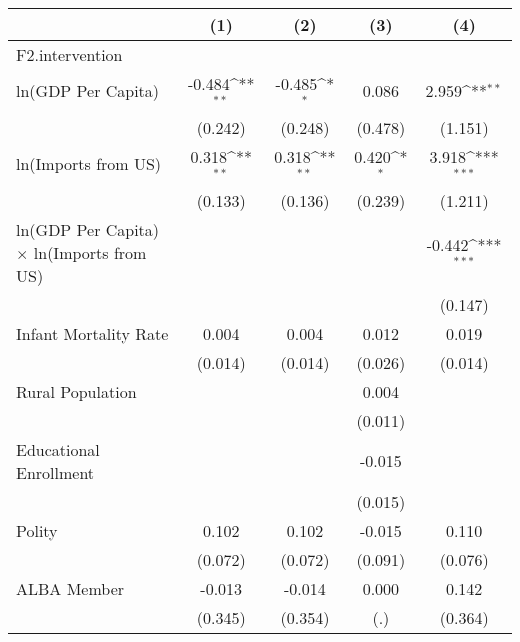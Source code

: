 {
\def\sym#1{\ifmmode^{#1}\else\(^{#1}\)\fi}
\begin{tabular}{l*{4}{c}}
\hline\hline
                &\multicolumn{1}{c}{(1)}         &\multicolumn{1}{c}{(2)}         &\multicolumn{1}{c}{(3)}         &\multicolumn{1}{c}{(4)}         \\
\hline
F2.intervention &                  &                  &                  &                  \\
ln(GDP Per Capita)&   -0.484\sym{**} &   -0.485\sym{*}  &    0.086         &    2.959\sym{**} \\
                &  (0.242)         &  (0.248)         &  (0.478)         &  (1.151)         \\
ln(Imports from US)&    0.318\sym{**} &    0.318\sym{**} &    0.420\sym{*}  &    3.918\sym{***}\\
                &  (0.133)         &  (0.136)         &  (0.239)         &  (1.211)         \\
ln(GDP Per Capita) $\times$ ln(Imports from US)&                  &                  &                  &   -0.442\sym{***}\\
                &                  &                  &                  &  (0.147)         \\
Infant Mortality Rate&    0.004         &    0.004         &    0.012         &    0.019         \\
                &  (0.014)         &  (0.014)         &  (0.026)         &  (0.014)         \\
Rural Population&                  &                  &    0.004         &                  \\
                &                  &                  &  (0.011)         &                  \\
Educational Enrollment&                  &                  &   -0.015         &                  \\
                &                  &                  &  (0.015)         &                  \\
Polity          &    0.102         &    0.102         &   -0.015         &    0.110         \\
                &  (0.072)         &  (0.072)         &  (0.091)         &  (0.076)         \\
ALBA Member     &   -0.013         &   -0.014         &    0.000         &    0.142         \\
                &  (0.345)         &  (0.354)         &      (.)         &  (0.364)         \\

\end{tabular}}
